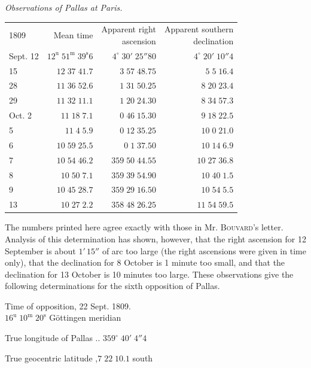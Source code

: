 \begin{center}\emph{Observations of Pallas at Paris.}\end{center}
\begin{center}\fontsize{9}{11}\selectfont\setlength{\tabcolsep}{5pt}\renewcommand{\arraystretch}{1.0}\begin{tabular}{lrrr}
1809 & Mean time & \shortstack{Apparent right\\ascension} & \shortstack{Apparent southern\\declination}\\
Sept. 12 & $12^{\text{u}}\;51^{\text{m}}\;39^{\text{s}}6$ & $4^\circ\;30'\;25''80$ & $4^\circ\;20'\;10''4$\\
15 & $12\;37\;41.7$ & $3\;57\;48.75$ & $5\;5\;16.4$\\
28 & $11\;36\;52.6$ & $1\;31\;50.25$ & $8\;20\;23.4$\\
29 & $11\;32\;11.1$ & $1\;20\;24.30$ & $8\;34\;57.3$\\
Oct. 2 & $11\;18\;7.1$ & $0\;46\;15.30$ & $9\;18\;22.5$\\
5 & $11\;4\;5.9$ & $0\;12\;35.25$ & $10\;0\;21.0$\\
6 & $10\;59\;25.5$ & $0\;1\;37.50$ & $10\;14\;6.9$\\
7 & $10\;54\;46.2$ & $359\;50\;44.55$ & $10\;27\;36.8$\\
8 & $10\;50\;7.1$ & $359\;39\;54.90$ & $10\;40\;1.5$\\
9 & $10\;45\;28.7$ & $359\;29\;16.50$ & $10\;54\;5.5$\\
13 & $10\;27\;2.2$ & $358\;48\;26.25$ & $11\;54\;59.5$\\
\end{tabular}\end{center}

\par\indent The numbers printed here agree exactly with those in Mr. \textsc{Bouvard}’s letter. Analysis of this determination has shown, however, that the right ascension for 12 September is about $1'\,15''$ of arc too large (the right ascensions were given in time only), that the declination for 8 October is 1 minute too small, and that the declination for 13 October is 10 minutes too large. These observations give the following determinations for the sixth opposition of Pallas.

\begin{center}Time of opposition, 22 Sept. 1809.\\$16^{\text{u}}\;10^{\text{m}}\;20^{\text{s}}$ Göttingen meridian\par True longitude of Pallas .\;.\; $359^\circ\;40'\;4''4$\par True geocentric latitude ,\quad $7\;22\;10.1$ south\end{center}

